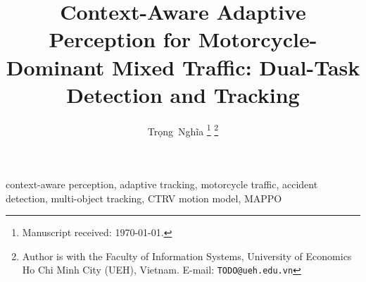 \documentclass[journal]{IEEEtran}
\title{Context-Aware Adaptive Perception for Motorcycle-Dominant
       Mixed Traffic: Dual-Task Detection and Tracking}
\author{Trọng~Nghĩa%
\thanks{Manuscript received: \today.}
\thanks{Author is with the Faculty of Information Systems,
        University of Economics Ho Chi Minh City (UEH), Vietnam.
        E-mail: \texttt{TODO@ueh.edu.vn}}}
\begin{document}
\maketitle

\begin{abstract}
  
\end{abstract}

\begin{IEEEkeywords}
  context-aware perception, adaptive tracking, motorcycle traffic,
  accident detection, multi-object tracking, CTRV motion model, MAPPO
\end{IEEEkeywords}










\end{document}
